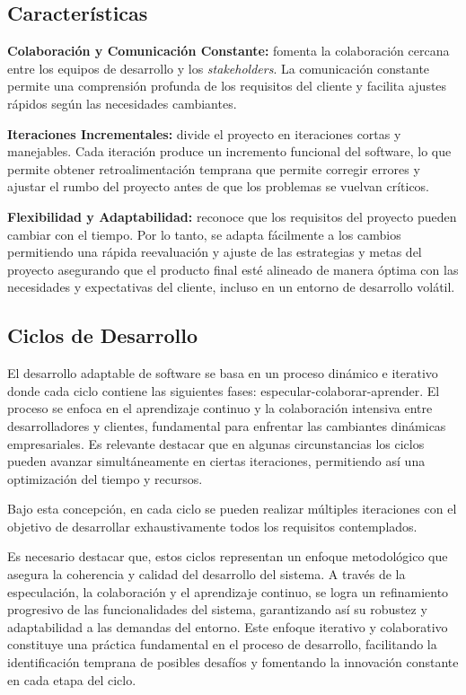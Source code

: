 \documentclass[
  12pt,
  openany]{book}
\begin{document}
\hypertarget{caracteruxedsticas}{%
\subsection{Características}\label{caracteruxedsticas}}

\textbf{Colaboración y Comunicación Constante:} fomenta la colaboración cercana entre los equipos de desarrollo y los \emph{stakeholders}. La comunicación constante permite una comprensión profunda de los requisitos del cliente y facilita ajustes rápidos según las necesidades cambiantes.

\textbf{Iteraciones Incrementales:} divide el proyecto en iteraciones cortas y manejables. Cada iteración produce un incremento funcional del software, lo que permite obtener retroalimentación temprana que permite corregir errores y ajustar el rumbo del proyecto antes de que los problemas se vuelvan críticos.

\textbf{Flexibilidad y Adaptabilidad:} reconoce que los requisitos del proyecto pueden cambiar con el tiempo. Por lo tanto, se adapta fácilmente a los cambios permitiendo una rápida reevaluación y ajuste de las estrategias y metas del proyecto asegurando que el producto final esté alineado de manera óptima con las necesidades y expectativas del cliente, incluso en un entorno de desarrollo volátil.

\hypertarget{ciclos-de-desarrollo}{%
\subsection{Ciclos de Desarrollo}\label{ciclos-de-desarrollo}}

El desarrollo adaptable de software se basa en un proceso dinámico e iterativo donde cada ciclo contiene las siguientes fases: especular-colaborar-aprender. El proceso se enfoca en el aprendizaje continuo y la colaboración intensiva entre desarrolladores y clientes, fundamental para enfrentar las cambiantes dinámicas empresariales. Es relevante destacar que en algunas circunstancias los ciclos pueden avanzar simultáneamente en ciertas iteraciones, permitiendo así una optimización del tiempo y recursos.

Bajo esta concepción, en cada ciclo se pueden realizar múltiples iteraciones con el objetivo de desarrollar exhaustivamente todos los requisitos contemplados.

Es necesario destacar que, estos ciclos representan un enfoque metodológico que asegura la coherencia y calidad del desarrollo del sistema. A través de la especulación, la colaboración y el aprendizaje continuo, se logra un refinamiento progresivo de las funcionalidades del sistema, garantizando así su robustez y adaptabilidad a las demandas del entorno. Este enfoque iterativo y colaborativo constituye una práctica fundamental en el proceso de desarrollo, facilitando la identificación temprana de posibles desafíos y fomentando la innovación constante en cada etapa del ciclo.
\end{document}
